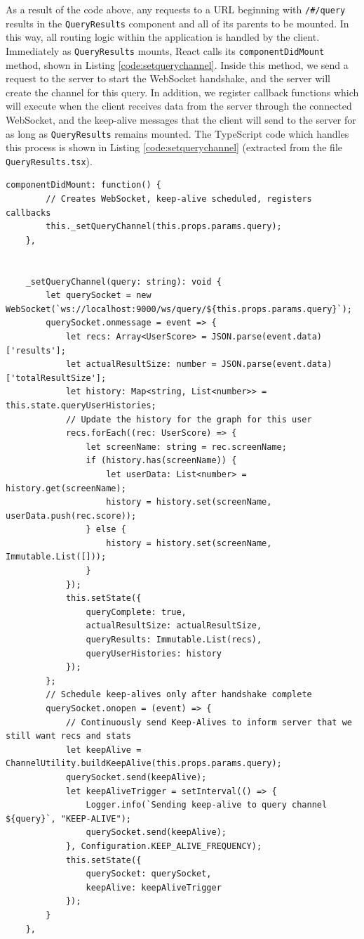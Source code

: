 \documentclass{l4proj}
\newcommand{\code}[1]{\texttt{#1}}
\begin{document}
As a result of the code above, any requests to a URL beginning with \code{/\#/query} results in the \code{QueryResults} component and all of its parents to be mounted. In this way, all routing logic within the application is handled by the client. Immediately as \code{QueryResults} mounts, React calls its \code{componentDidMount} method, shown in Listing \ref{code:setquerychannel}. Inside this method, we send a request to the server to start the WebSocket handshake, and the server will create the channel for this query. In addition, we register callback functions which will execute when the client receives data from the server through the connected WebSocket, and the keep-alive messages that the client will send to the server for as long as \code{QueryResults} remains mounted. The TypeScript code which handles this process is shown in Listing \ref{code:setquerychannel} (extracted from the file \code{QueryResults.tsx}).

\begin{lstlisting}[caption=The method called by React when a new component mounts.,label=code:setquerychannel]
    componentDidMount: function() {
        // Creates WebSocket, keep-alive scheduled, registers callbacks
        this._setQueryChannel(this.props.params.query);
    },


    _setQueryChannel(query: string): void {
        let querySocket = new WebSocket(`ws://localhost:9000/ws/query/${this.props.params.query}`);
        querySocket.onmessage = event => {
            let recs: Array<UserScore> = JSON.parse(event.data)['results'];
            let actualResultSize: number = JSON.parse(event.data)['totalResultSize'];
            let history: Map<string, List<number>> = this.state.queryUserHistories;
            // Update the history for the graph for this user
            recs.forEach((rec: UserScore) => {
                let screenName: string = rec.screenName;
                if (history.has(screenName)) {
                    let userData: List<number> = history.get(screenName);
                    history = history.set(screenName, userData.push(rec.score));
                } else {
                    history = history.set(screenName, Immutable.List([]));
                }
            });
            this.setState({
                queryComplete: true,
                actualResultSize: actualResultSize,
                queryResults: Immutable.List(recs),
                queryUserHistories: history
            });
        };
        // Schedule keep-alives only after handshake complete
        querySocket.onopen = (event) => {
            // Continuously send Keep-Alives to inform server that we still want recs and stats
            let keepAlive = ChannelUtility.buildKeepAlive(this.props.params.query);
            querySocket.send(keepAlive);
            let keepAliveTrigger = setInterval(() => {
                Logger.info(`Sending keep-alive to query channel ${query}`, "KEEP-ALIVE");
                querySocket.send(keepAlive);
            }, Configuration.KEEP_ALIVE_FREQUENCY);
            this.setState({
                querySocket: querySocket,
                keepAlive: keepAliveTrigger
            });
        }
    },

\end{lstlisting}
        
\end{document}
